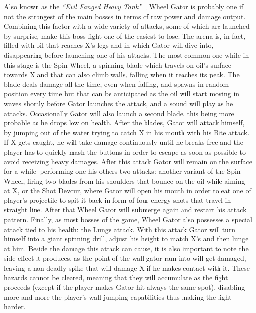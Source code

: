 Also known as the \textit{``Evil Fanged Heavy Tank''}~\cite{book:MMX_Complete_art}, Wheel Gator is probably one if not the strongest of the main bosses in terms of raw power and damage output. Combining this factor with a wide variety of attacks, some of which are launched by surprise, make this boss fight one of the easiest to lose. The arena is, in fact, filled with oil that reaches X's legs and in which Gator will dive into, disappearing before launching one of his attacks. The most common one while in this stage is the Spin Wheel, a spinning blade which travels on oil's surface towards X and that can also climb walls, falling when it reaches its peak. The blade deals damage all the time, even when falling, and spawns in random position every time but that can be anticipated as the oil will start moving in waves shortly before Gator launches the attack, and a sound will play as he attacks. Occasionally Gator will also launch a second blade, this being more probable as he drops low on health. After the blades, Gator will attack himself, by jumping out of the water trying to catch X in his mouth with his Bite attack. If X gets caught, he will take damage continuously until he breaks free and the player has to quickly mash the buttons in order to escape as soon as possible to avoid receiving heavy damages. After this attack Gator will remain on the surface for a while, performing one his others two attacks: another variant of the Spin Wheel, firing two blades from his shoulders that bounce on the oil while aiming at X, or the Shot Devour, where Gator will open his mouth in order to eat one of player's projectile to spit it back in form of four energy shots that travel in straight line. After that Wheel Gator will submerge again and restart his attack pattern. Finally, as most bosses of the game, Wheel Gator also possesses a special attack tied to his health: the Lunge attack. With this attack Gator will turn himself into a giant spinning drill, adjust his height to match X's and then lunge at him. Beside the damage this attack can cause, it is also important to note the side effect it produces, as the point of the wall gator ram into will get damaged, leaving a non-deadly spike that will damage X if he makes contact with it. These hazards cannot be cleared, meaning that they will accumulate as the fight proceeds (except if the player makes Gator hit always the same spot), disabling more and more the player's wall-jumping capabilities thus making the fight harder.

